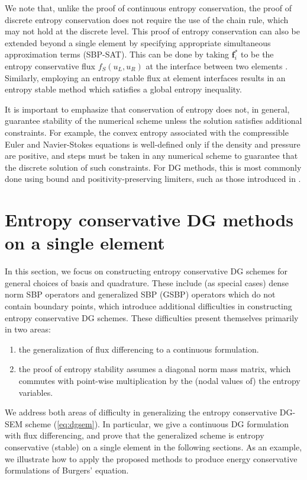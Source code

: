 \documentclass[preprint,10pt]{article}
\theoremstyle{definition}
\theoremstyle{lemma}
\theoremstyle{theorem}
\theoremstyle{assumption}
\begin{document}
We note that, unlike the proof of continuous entropy conservation, the proof of discrete entropy conservation does not require the use of the chain rule, which may not hold at the discrete level.  This proof of entropy conservation can also be extended beyond a single element by specifying appropriate simultaneous approximation terms (SBP-SAT).  This can be done by taking $\bm{f}_i^*$ to be the entropy conservative flux $f_S(u_L,u_R)$ at the interface between two elements \cite{carpenter2014entropy, gassner2017br1, chen2017entropy}.  Similarly, employing an entropy stable flux at element interfaces results in an entropy stable method which satisfies a global entropy inequality.  

It is important to emphasize that conservation of entropy does not, in general, guarantee stability of the numerical scheme unless the solution satisfies additional constraints.  For example, the convex entropy associated with the compressible Euler and Navier-Stokes equations is well-defined only if the density and pressure are positive, and steps must be taken in any numerical scheme to guarantee that the discrete solution of such constraints.  For DG methods, this is most commonly done using bound and positivity-preserving limiters, such as those introduced in \cite{zhang2010positivity, zhang2012maximum}.  



\section{Entropy conservative DG methods on a single element}
\label{sec:ecdg}

In this section, we focus on constructing entropy conservative DG schemes for general choices of basis and quadrature.  These include (as special cases) dense norm SBP operators and generalized SBP (GSBP) operators which do not contain boundary points, which introduce additional difficulties in constructing entropy conservative DG schemes.  These difficulties present themselves primarily in two areas: 
\begin{enumerate}
\item the generalization of flux differencing to a continuous formulation.  
\item the proof of entropy stability assumes a diagonal norm mass matrix, which commutes with point-wise multiplication by the (nodal values of) the entropy variables.  
\end{enumerate}

We address both areas of difficulty in generalizing the entropy conservative DG-SEM scheme (\ref{eq:dgsem}).  In particular, we give a continuous DG formulation with flux differencing, and prove that the generalized scheme is entropy conservative (stable) on a single element in the following sections.  As an example, we illustrate how to apply the proposed methods to produce energy conservative formulations of Burgers' equation.  
\end{document}
